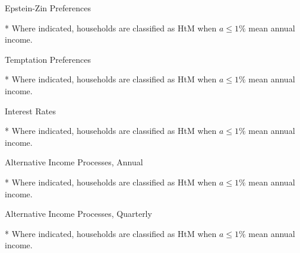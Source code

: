 \documentclass{article}
\begin{document}
\begin{table}[h]
\caption{Epstein-Zin Preferences}
\begin{threeparttable}
\centering


\begin{tablenotes}
	\item[*] Where indicated, households are classified as HtM when $a \leq 1\%$ mean annual income.
\end{tablenotes}
\end{threeparttable}
\end{table}

\begin{table}[h]
\caption{Temptation Preferences}
\begin{threeparttable}
\centering


\begin{tablenotes}
	\item[*] Where indicated, households are classified as HtM when $a \leq 1\%$ mean annual income.
\end{tablenotes}
\end{threeparttable}
\end{table}

\begin{table}[h]
\caption{Interest Rates}
\begin{threeparttable}
\centering


\begin{tablenotes}
	\item[*] Where indicated, households are classified as HtM when $a \leq 1\%$ mean annual income.
\end{tablenotes}
\end{threeparttable}
\end{table}

\begin{table}[h]
\caption{Alternative Income Processes, Annual}
\begin{threeparttable}
\centering


\begin{tablenotes}
	\item[*] Where indicated, households are classified as HtM when $a \leq 1\%$ mean annual income.
\end{tablenotes}
\end{threeparttable}
\end{table}

\begin{table}[h]
\caption{Alternative Income Processes, Quarterly}
\begin{threeparttable}
\centering


\begin{tablenotes}
	\item[*] Where indicated, households are classified as HtM when $a \leq 1\%$ mean annual income.
\end{tablenotes}
\end{threeparttable}
\end{table}
\end{document}
